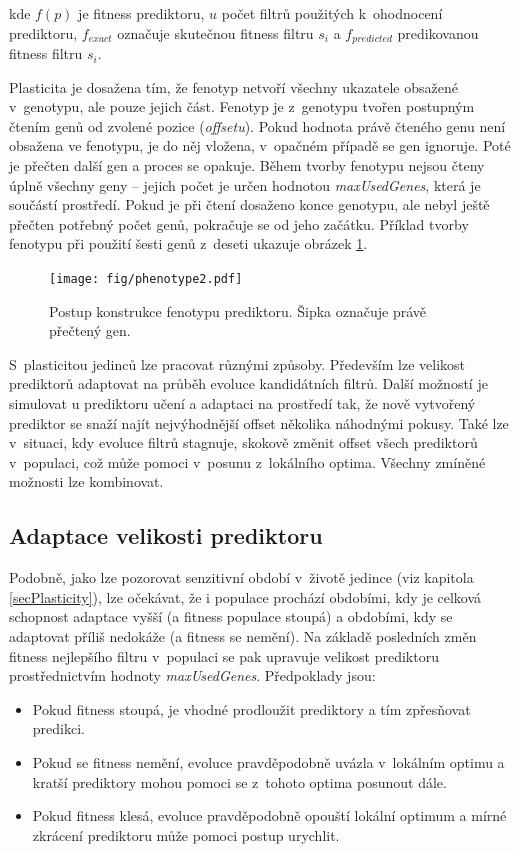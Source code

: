 \noindent{}kde $f \left( p \right)$ je fitness prediktoru, $u$ počet filtrů použitých k~ohodnocení prediktoru, $f_{\mathit{exact}}$ označuje skutečnou fitness filtru $s_i$ a $f_{\mathit{predicted}}$ predikovanou fitness filtru $s_i$.

Plasticita je dosažena tím, že fenotyp netvoří všechny ukazatele obsažené v~genotypu, ale pouze jejich část. Fenotyp je z~genotypu tvořen postupným čtením genů od zvolené pozice (\emph{offsetu}). Pokud hodnota právě čteného genu není obsažena ve fenotypu, je do něj vložena, v~opačném případě se gen ignoruje. Poté je přečten další gen a proces se opakuje. Během tvorby fenotypu nejsou čteny úplně všechny geny -- jejich počet je určen hodnotou \emph{maxUsedGenes}, která je součástí prostředí. Pokud je při čtení dosaženo konce genotypu, ale nebyl ještě přečten potřebný počet genů, pokračuje se od jeho začátku. Příklad tvorby fenotypu při použití šesti genů z~deseti ukazuje obrázek \ref{obrFenotyp}.

\begin{figure}[htb]
    \centering\texttt{[image: fig/phenotype2.pdf]}
    \caption{Postup konstrukce fenotypu prediktoru. Šipka označuje právě přečtený gen.}
    \label{obrFenotyp}
\end{figure}

S~plasticitou jedinců lze pracovat různými způsoby. Především lze velikost prediktorů adaptovat na průběh evoluce kandidátních filtrů. Další možností je simulovat u prediktoru učení a adaptaci na prostředí tak, že nově vytvořený prediktor se snaží najít nejvýhodnější offset několika náhodnými pokusy. Také lze v~situaci, kdy evoluce filtrů stagnuje, skokově změnit offset všech prediktorů v~populaci, což může pomoci v~posunu z~lokálního optima. Všechny zmíněné možnosti lze kombinovat.

\subsection{Adaptace velikosti prediktoru}

Podobně, jako lze pozorovat senzitivní období v~životě jedince (viz kapitola \ref{secPlasticity}), lze očekávat, že i populace prochází obdobími, kdy je celková schopnost adaptace vyšší (a fitness populace stoupá) a obdobími, kdy se adaptovat příliš nedokáže (a fitness se nemění). Na základě posledních změn fitness nejlepšího filtru v~populaci se pak upravuje velikost prediktoru prostřednictvím hodnoty \emph{maxUsedGenes}. Předpoklady jsou:

\begin{itemize}
    \item Pokud fitness stoupá, je vhodné prodloužit prediktory a tím zpřesňovat predikci.
    \item Pokud se fitness nemění, evoluce pravděpodobně uvázla v~lokálním optimu a kratší prediktory mohou pomoci se z~tohoto optima posunout dále.
    \item Pokud fitness klesá, evoluce pravděpodobně opouští lokální optimum a mírné zkrácení prediktoru může pomoci postup urychlit.
\end{itemize}

